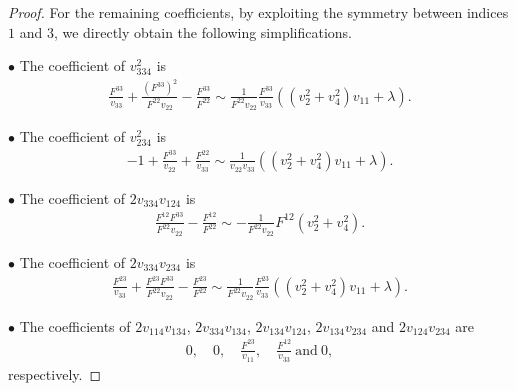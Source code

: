 \documentclass[11pt]{amsart}
\numberwithin{theorem}{section}
\numberwithin{equation}{section}
\begin{document}
\begin{proof}
For the remaining coefficients, by exploiting the symmetry between indices $1$ and $3$, we directly obtain the following simplifications.
 
$\bullet$ The coefficient of $v_{334}^2$ is
\begin{align*} \frac{F^{33}}{v_{33}}+\frac{(F^{33})^2}{F^{22}v_{22}}-\frac{F^{33}}{F^{22}}\sim\frac{1}{F^{22}v_{22}}\frac{F^{33}}{v_{33}}\left((v_2^2+v_4^2)v_{11}+\lambda\right).
\end{align*}
 
$\bullet$ The coefficient of $v_{234}^2$ is
\begin{align*}
-1+\frac{F^{33}}{v_{22}}+\frac{F^{22}}{v_{33}}\sim\frac{1}{v_{22}v_{33}}\left((v_2^2+v_4^2)v_{11}+\lambda\right).
\end{align*}

$\bullet$ The coefficient of $2v_{334}v_{124}$ is
\begin{align*}
\frac{F^{12}F^{33}}{F^{22}v_{22}}-\frac{F^{12}}{F^{22}}\sim-\frac{1}{F^{22}v_{22}}F^{12}(v_2^2+v_4^2).
\end{align*}
 
$\bullet$ The coefficient of $2v_{334}v_{234}$ is
\begin{align*}
\frac{F^{23}}{v_{33}}+\frac{F^{23}F^{33}}{F^{22}v_{22}}-\frac{F^{23}}{F^{22}}\sim\frac{1}{F^{22}v_{22}}\frac{F^{23}}{v_{33}}\left((v_2^2+v_4^2)v_{11}+\lambda\right).
\end{align*}
 
$\bullet$ The coefficients of $2v_{114}v_{134}$, $2v_{334}v_{134}$, $2v_{134}v_{124}$, $2v_{134}v_{234}$ and $2v_{124}v_{234}$ are
\begin{align*}
0, \quad 0, \quad \frac{F^{23}}{v_{11}}, \quad \frac{F^{12}}{v_{33}} \ \mathrm{and} \ 0,
\end{align*}
respectively.
 

\end{proof}
\end{document}
